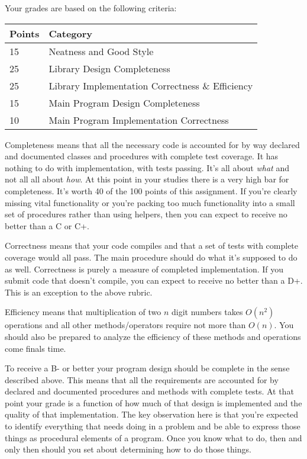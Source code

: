 \documentclass[10pt]{article}
\begin{document}
Your grades are based on the following criteria:
\begin{center}
\begin{tabular}{ll}
Points & Category \\ \hline
15  & Neatness and Good Style \\
25  & Library Design Completeness \\
25  & Library Implementation Correctness \& Efficiency \\
15  & Main Program Design Completeness \\
10  & Main Program Implementation Correctness     
\end{tabular}
\end{center}

Completeness means that all the necessary code is accounted for by way declared and documented classes and procedures with complete test coverage. It has nothing to do with implementation, with tests passing. It's all about \textit{what} and not all all about \textit{how}. At this point in your studies there is a very high bar for completeness.  It's worth 40 of the 100 points of this assignment. If you're clearly missing vital functionality or you're packing too much functionality into a small set of procedures rather than using helpers, then you can expect to receive no better than a C or C+. 

Correctness means that your code compiles and that a set of tests with complete coverage would all pass. The main procedure should do what it's supposed to do as well.  Correctness is purely a measure of completed implementation.  If you submit code that doesn't compile, you can expect to receive no better than a D+.  This is an exception to the above rubric. 

Efficiency means that multiplication of two $n$ digit numbers takes $O(n^2)$ operations and all other methods/operators require not more than $O(n)$. You should also be prepared to analyze the efficiency of these methods and operations come finals time.  

To receive a B- or better your program design should be complete in the sense described above. This means that all the requirements are accounted for by declared and documented procedures and methods with complete tests. At that point your grade is a function of how much of that design is implemented and the quality of that implementation. The key observation here is that you're expected to identify everything that needs doing in a problem and be able to express those things as procedural elements of a program.  Once you know what to do, then and only then should you set about determining how to do those things.    
\end{document}
